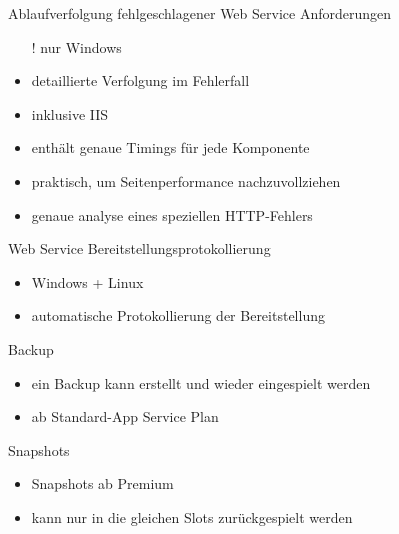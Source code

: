 \begin{flashcard}[Definition]{Ablaufverfolgung fehlgeschlagener Web Service Anforderungen}
    \begin{itemize}
        \item[!] nur Windows
        \item detaillierte Verfolgung im Fehlerfall
        \item inklusive IIS
        \item enthält genaue Timings für jede Komponente
        \item praktisch, um Seitenperformance nachzuvollziehen
        \item genaue analyse eines speziellen HTTP-Fehlers
    \end{itemize}
\end{flashcard}

\begin{flashcard}[Definition]{Web Service Bereitstellungsprotokollierung}
    \begin{itemize}
        \item Windows + Linux
        \item automatische Protokollierung der Bereitstellung
    \end{itemize}
\end{flashcard}

\begin{flashcard}[Definition]{Backup}
    \begin{itemize}
        \item ein Backup kann erstellt und wieder eingespielt werden
        \item ab Standard-App Service Plan
    \end{itemize}
\end{flashcard}

\begin{flashcard}[Definition]{Snapshots}
    \begin{itemize}
        \item Snapshots ab Premium
        \item kann nur in die gleichen Slots zurückgespielt werden
    \end{itemize}
\end{flashcard}
